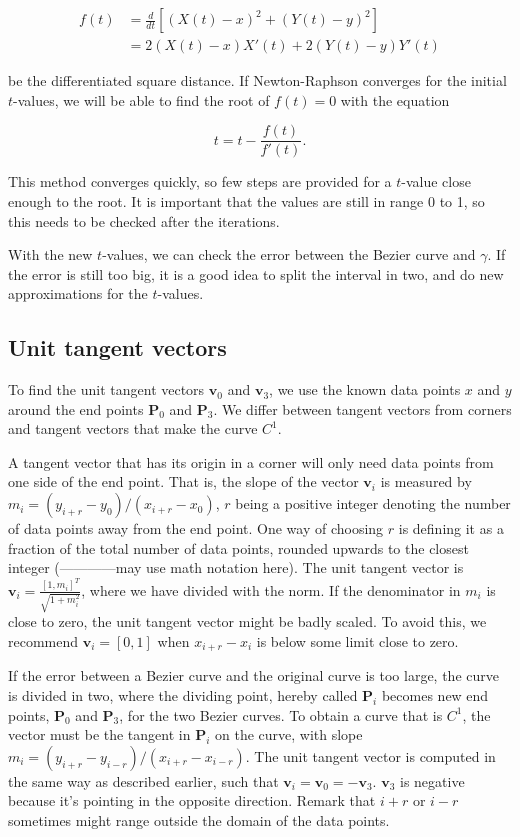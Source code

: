 \documentclass[10pt]{article}
\begin{document}
\begin{align}
f(t) &= \frac{d}{dt} [(X(t)-x)^2 + (Y(t)-y)^2 ] \\
&= 2(X(t)-x)X'(t) + 2(Y(t)-y)Y'(t)
\end{align}

be the differentiated square distance. If Newton-Raphson converges for the initial $t$-values, we will be able to find the root of $f(t) = 0$ with the equation

\begin{equation}
t = t - \frac{f(t)}{f'(t)}.
\end{equation}

This method converges quickly, so few steps are provided for a $t$-value close enough to the root. It is important that the values are still in range 0 to 1, so this needs to be checked after the iterations. 

With the new $t$-values, we can check the error between the Bezier curve and $\gamma$. If the error is still too big, it is a good idea to split the interval in two, and do new approximations for the $t$-values.



\subsection*{Unit tangent vectors}
To find the unit tangent vectors $\mathbf{v}_0$ and $\mathbf{v}_3$, we use the known data points $x$ and $y$ around the end points $\mathbf{P}_0$ and $\mathbf{P}_3$. We differ between tangent vectors from corners and tangent vectors that make the curve $C^1$.

A tangent vector that has its origin in a corner will only need data points from one side of the end point. That is, the slope of the vector $\mathbf{v}_i$ is measured by $m_i = (y_{i+r} - y_0)/(x_{i+r} - x_0)$, $r$ being a positive integer denoting the number of data points away from the end point. One way of choosing $r$ is defining it as a fraction of the total number of data points, rounded upwards to the closest integer (------------may use math notation here).
 The unit tangent vector is  $\mathbf{v}_i = \frac{[1, m_i]^T}{\sqrt{1+m_i^2}}$, where we have divided with the norm. If the denominator in $m_i$ is close to zero, the unit tangent vector might be badly scaled. To avoid this, we recommend $\mathbf{v}_i = [0,1]$ when $x_{i+r} - x_i$ is below some limit close to zero. 

If the error between a Bezier curve and the original curve is too large, the curve is divided in two, where the dividing point, hereby called $\mathbf{P}_i$ becomes new end points, $\mathbf{P}_0$ and $\mathbf{P}_3$, for the two Bezier curves. To obtain a curve that is $C^1$, the vector must be the tangent in $\mathbf{P}_i$ on the curve, with slope $m_i = (y_{i+r} - y_{i-r})/(x_{i+r} - x_{i-r})$. The unit tangent vector is computed in the same way as described earlier, such that $\mathbf{v}_i = \mathbf{v}_0 = -\mathbf{v}_3$. $\mathbf{v}_3$ is negative because it's pointing in the opposite direction. Remark that $i+r$ or $i-r$ sometimes might range outside the domain of the data points. 
\end{document}
